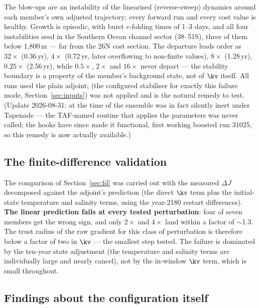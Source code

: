The blow-ups are an instability of the linearised (reverse-sweep) dynamics
around each member's own adjusted trajectory; every forward run and every cost
value is healthy. Growth is episodic, with burst $e$-folding times of 1--3
days, and all four instabilities seed in the Southern Ocean channel sector
(38--51\dg S), three of them below 1{,}800\,m --- far from the 26\dg N cost
section. The departure leads order as $32\times$ (0.36\,yr), $4\times$
(0.72\,yr, later overflowing to non-finite values), $8\times$ (1.28\,yr),
$0.25\times$ (2.56\,yr), while $0.5\times$, $2\times$ and $16\times$ never
depart --- the stability boundary is a property of the member's background
state, not of $\kv$ itself. All runs used the plain adjoint;
 (the configured stabiliser for exactly this failure mode,
Section~\ref{sec:inputs}) was not applied and is the natural remedy to test.
(Update 2026-08-31: at the time of the ensemble  was in
fact silently inert under Tapenade --- the TAF-named routine that applies the
 parameters was never called; the  hooks
have since made it functional, first working boosted run 31025, so this remedy
is now actually available.)

\subsection{The finite-difference validation}
\label{sec:results-fd}

The comparison of Section~\ref{sec:fd} was carried out with the measured
$\Delta J$ decomposed against the adjoint's prediction (the direct $\kv$ term
plus the initial-state temperature and salinity terms, using the year-2180
restart differences). \textbf{The linear prediction fails at every tested
perturbation}: four of seven members get the wrong sign, and only $2\times$ and
$4\times$ land within a factor of $\sim$1.3. The trust radius of the raw
gradient for this class of perturbation is therefore below a factor of two in
$\kv$ --- the smallest step tested. The failure is dominated by the ten-year
state adjustment (the temperature and salinity terms are individually large and
nearly cancel), not by the in-window $\kv$ term, which is small throughout.

\subsection{Findings about the configuration itself}
\label{sec:results-config}

